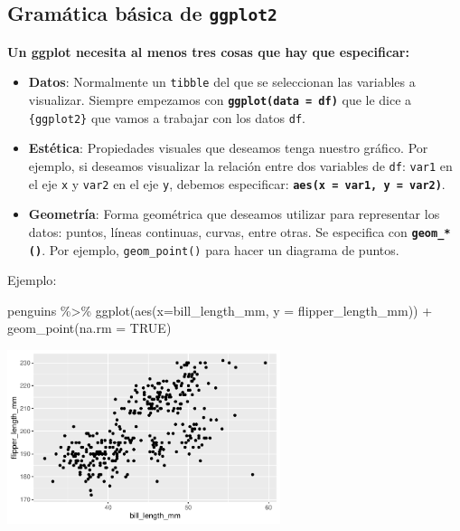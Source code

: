 \documentclass[
  letterpaper,
  DIV=11,
  numbers=noendperiod]{scrreprt}
\newenvironment{Shaded}{\begin{snugshade}}{\end{snugshade}}
\newcommand{\AttributeTok}[1]{\textcolor[rgb]{0.40,0.45,0.13}{#1}}
\newcommand{\ConstantTok}[1]{\textcolor[rgb]{0.56,0.35,0.01}{#1}}
\newcommand{\FunctionTok}[1]{\textcolor[rgb]{0.28,0.35,0.67}{#1}}
\newcommand{\NormalTok}[1]{\textcolor[rgb]{0.00,0.23,0.31}{#1}}
\newcommand{\SpecialCharTok}[1]{\textcolor[rgb]{0.37,0.37,0.37}{#1}}
\begin{document}
\subsection{\texorpdfstring{Gramática básica de
\texttt{ggplot2}}{Gramática básica de ggplot2}}\label{gramuxe1tica-buxe1sica-de-ggplot2}

\textbf{Un ggplot necesita al menos tres cosas que hay que especificar:
}

\begin{itemize}
\item
  \textbf{Datos}: Normalmente un \texttt{tibble} del que se seleccionan
  las variables a visualizar. Siempre empezamos con
  \textbf{\texttt{ggplot(data\ =\ df)}} que le dice a
  \texttt{\{ggplot2\}} que vamos a trabajar con los datos \texttt{df}.
\item
  \textbf{Estética}: Propiedades visuales que deseamos tenga nuestro
  gráfico. Por ejemplo, si deseamos visualizar la relación entre dos
  variables de \texttt{df}: \texttt{var1} en el eje \texttt{x} y
  \texttt{var2} en el eje \texttt{y}, debemos especificar:
  \textbf{\texttt{aes(x\ =\ var1,\ y\ =\ var2)}}.
\item
  \textbf{Geometría}: Forma geométrica que deseamos utilizar para
  representar los datos: puntos, líneas continuas, curvas, entre otras.
  Se especifica con \textbf{\texttt{geom\_*()}}. Por ejemplo,
  \texttt{geom\_point()} para hacer un diagrama de puntos.
\end{itemize}

{Ejemplo}:

\begin{Shaded}
\begin{Highlighting}[]
\NormalTok{penguins }\SpecialCharTok{\%\textgreater{}\%} 
  \FunctionTok{ggplot}\NormalTok{(}\FunctionTok{aes}\NormalTok{(}\AttributeTok{x=}\NormalTok{bill\_length\_mm, }\AttributeTok{y =}\NormalTok{ flipper\_length\_mm)) }\SpecialCharTok{+}
  \FunctionTok{geom\_point}\NormalTok{(}\AttributeTok{na.rm =} \ConstantTok{TRUE}\NormalTok{)}
\end{Highlighting}
\end{Shaded}

\begin{center}
\includegraphics[width=0.6\textwidth,height=0.6\textheight]{t1_intro_files/figure-pdf/unnamed-chunk-90-1.pdf}
\end{center}
\end{document}
